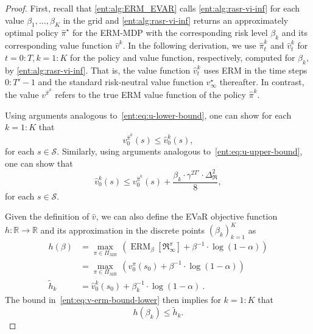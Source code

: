 \documentclass[twoside]{article}
\newcommand{\states}{\mathcal{S}}
\newcommand{\opt}{^\star}
\newcommand{\vspan}{\Delta_{\mathfrak{R}}}
\newcommand{\erm}[2]{\operatorname{ERM}_{#1}\left[#2\right]}
\newcommand{\Real}{\mathbb{R}}
\theoremstyle{plain}
\theoremstyle{definition}
\theoremstyle{remark}
\begin{document}
\begin{proof}
First, recall that \cref{ent:alg:ERM_EVAR} calls \cref{ent:alg:rasr-vi-inf} for each value $\beta_1, \dots , \beta_K$ in the grid and \cref{ent:alg:rasr-vi-inf} returns an approximately optimal policy $\hat{\pi}^\star$ for the ERM-MDP with the corresponding risk level $\beta_k$ and its corresponding value function $\hat{v}^k$. In the following derivation, we use $\hat{\pi}^k_t$ and $\hat{v}_t^k$ for $t=0{:}T, k = 1{:}K$ for the policy and value function, respectively, computed for $\beta_k, $ by \cref{ent:alg:rasr-vi-inf}. That is, the value function $\hat{v}_t^k$ uses ERM in the time steps $0{:}T'{-}1$ and the standard risk-neutral value function $v_{\infty}\opt$ thereafter. In contrast, the value $v^{\hat{\pi}^k}$ refers to the true ERM value function of the policy $\hat{\pi}^k$.

Using arguments analogous to~\eqref{ent:eq:u-lower-bound}, one can show for each $k=1{:}K$ that
%
\begin{equation}\label{ent:eq:v-erm-bound-lower}
v^{\hat{\pi}^k}_{0}(s) \le \hat{v}_{0}^k(s) ,
\end{equation}
%
for each $s\in \states$. Similarly, using arguments analogous to~\eqref{ent:eq:u-upper-bound}, one can show that 
\begin{equation} \label{ent:eq:v-erm-bound-upper}
  \hat{v}_{0}^k(s) \le v^{\hat{\pi}^k}_{0}(s) + \frac{\beta_k \cdot \gamma^{2T'} \cdot \vspan^2}{8},
\end{equation}
for each $s\in \states$. 

Given the definition of $\hat{v}$, we can also define the EVaR objective function $h\colon \Real \to \Real $ and its approximation in the discrete points $(\beta_k)_{k=1}^{K}$ as
\begin{align*}
  h(\beta) &= \max_{\pi\in\Pi_{MR}}\, \left(\erm{\beta}{\mathfrak{R}_{\infty}^\pi} + \beta^{-1} \cdot \log(1-\alpha) \right)  \\
   &= \max_{\pi\in\Pi_{MR}}\, \left(v_{0}^{\pi}(s_0) + \beta^{-1} \cdot \log(1-\alpha) \right)  \\
  \tilde{h}_k &=  \hat{v}_0^k(s_0) + \beta_k^{-1} \cdot \log(1-\alpha)  ~. 
\end{align*}
The bound in~\eqref{ent:eq:v-erm-bound-lower} then implies for $k=1{:}K$ that
\begin{equation}\label{ent:eq:h-bound}
  h(\beta_k) \le  \tilde{h}_k .
\end{equation}


\end{proof}
\end{document}
